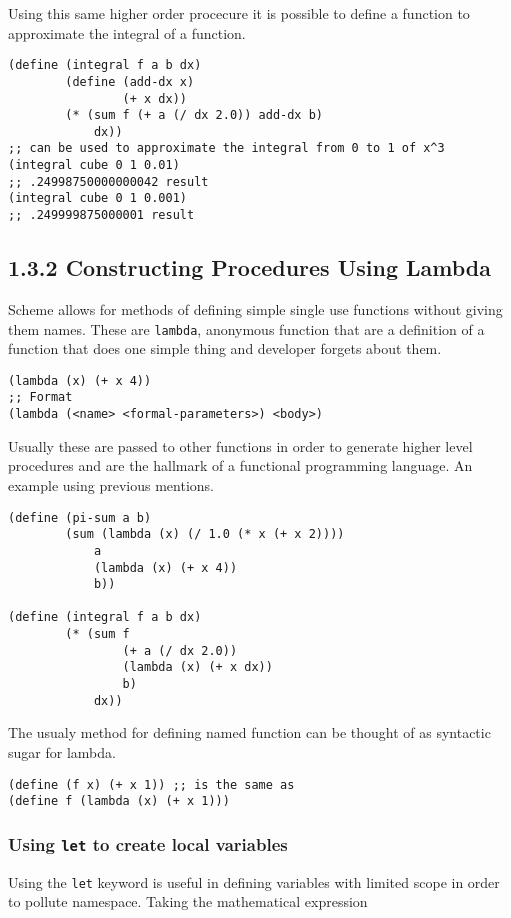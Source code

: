 \documentclass[11pt]{article}
\begin{document}
Using this same higher order procecure it is possible to define a
function to approximate the integral of a function.

\begin{verbatim}
(define (integral f a b dx)
        (define (add-dx x)
                (+ x dx))
        (* (sum f (+ a (/ dx 2.0)) add-dx b)
            dx))
;; can be used to approximate the integral from 0 to 1 of x^3
(integral cube 0 1 0.01)
;; .24998750000000042 result
(integral cube 0 1 0.001)
;; .249999875000001 result
\end{verbatim}

\subsection{1.3.2 Constructing Procedures Using Lambda}
\label{sec:orge0b7f2d}
Scheme allows for methods of defining simple single use functions
without giving them names. These are \texttt{lambda}, anonymous function that
are a definition of a function that does one simple thing and developer
forgets about them.

\begin{verbatim}
(lambda (x) (+ x 4))
;; Format
(lambda (<name> <formal-parameters>) <body>)
\end{verbatim}

Usually these are passed to other functions in order to generate higher
level procedures and are the hallmark of a functional programming
language. An example using previous mentions.

\begin{verbatim}
(define (pi-sum a b)
        (sum (lambda (x) (/ 1.0 (* x (+ x 2))))
            a
            (lambda (x) (+ x 4))
            b))

(define (integral f a b dx)
        (* (sum f
                (+ a (/ dx 2.0))
                (lambda (x) (+ x dx))
                b)
            dx))
\end{verbatim}

The usualy method for defining named function can be thought of as
syntactic sugar for lambda.

\begin{verbatim}
(define (f x) (+ x 1)) ;; is the same as
(define f (lambda (x) (+ x 1)))
\end{verbatim}

\subsubsection{Using \texttt{let} to create local variables}
\label{sec:orgda032b8}
Using the \texttt{let} keyword is useful in defining variables with limited
scope in order to pollute namespace. Taking the mathematical expression
\end{document}
